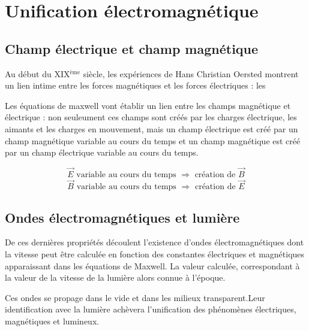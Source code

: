 
\section{Unification électromagnétique}

\subsection{Champ électrique et champ magnétique}

Au début du XIX$^\text{ème}$ siècle, les expériences de Hans Christian Oersted montrent un lien intime entre les forces magnétiques et les forces électriques : les 

Les équations de maxwell vont établir un lien entre les champs magnétique et électrique : non seuleument ces champs sont créés par les charges électrique, les aimants et les charges en mouvement, mais un champ électrique est créé par un champ magnétique variable au cours du temps et un champ magnétique est créé par un champ électrique variable au cours du temps.

\[
\overrightarrow{E} \text{ variable au cours du temps } \Rightarrow \text{ création de } \overrightarrow{B}
\]
\[
\overrightarrow{B} \text{ variable au cours du temps } \Rightarrow \text{ création de } \overrightarrow{E}
\]


\subsection{Ondes électromagnétiques et lumière}

De ces dernières propriétés découlent l'existence d'ondes électromagnétiques dont la vitesse peut être calculée en fonction des constantes électriques et magnétiques apparaissant dans les équations de Maxwell. La valeur calculée, correspondant à la valeur de la vitesse de la lumière alors connue à l'époque.

Ces ondes se propage dans le vide et dans les milieux transparent.Leur identification avec la lumière achèvera l'unification des phénomènes électriques, magnétiques et lumineux.

